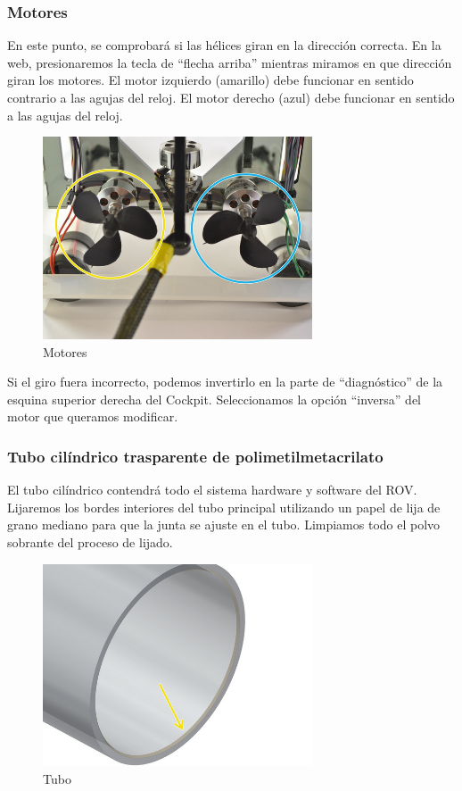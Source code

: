 \subsubsection{Motores}
\label{subsubsec:motores}
En este punto, se comprobará si las hélices giran en la dirección correcta. En la web, presionaremos la tecla de “flecha arriba” mientras miramos en que dirección giran los motores.
El motor izquierdo (amarillo) debe funcionar en sentido contrario a las agujas del reloj.
El motor derecho (azul) debe funcionar en sentido a las agujas del reloj.
\begin{figure} [hbtp]
\begin{center}
  \includegraphics[width=8cm]{img/cap3/3_4/motores}
\end{center}
\caption{Motores}
\label{fig:motores}
\end{figure}

Si el giro fuera incorrecto, podemos invertirlo en la parte de “diagnóstico” de la esquina superior derecha del Cockpit. Seleccionamos la opción “inversa” del motor que queramos modificar.
\subsubsection{Tubo cilíndrico trasparente de polimetilmetacrilato}
\label{subsubsec:tubo}
El tubo cilíndrico contendrá todo el sistema hardware y software del ROV.
Lijaremos los bordes interiores del tubo principal utilizando un papel de lija de grano mediano para que la junta se ajuste en el tubo.
Limpiamos todo el polvo sobrante del proceso de lijado.
\begin{figure} [hbtp]
\begin{center}
  \includegraphics[width=8cm]{img/cap3/3_4/tubo}
\end{center}
\caption{Tubo}
\label{fig:tubo}
\end{figure}

